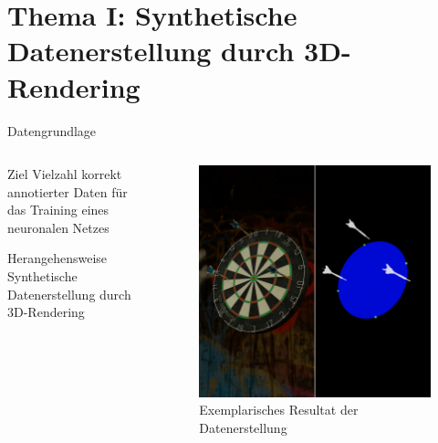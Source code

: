 \section{Thema I: Synthetische Datenerstellung durch 3D-Rendering}

\begin{frame}{Datengrundlage}
    \begin{columns}
        \begin{column}{0.6\linewidth}

            \begin{block}{Ziel}
                Vielzahl korrekt annotierter Daten für das Training eines neuronalen Netzes
            \end{block}

            \begin{block}{Herangehensweise}
                Synthetische Datenerstellung durch 3D-Rendering
            \end{block}

        \end{column}
        \begin{column}{0.4\linewidth}

            \begin{figure}
                \centering
                \includegraphics[height=0.65\textheight]{imgs/datagen.png}
                \caption{Exemplarisches Resultat der Datenerstellung}
            \end{figure}

        \end{column}
    \end{columns}
\end{frame}


